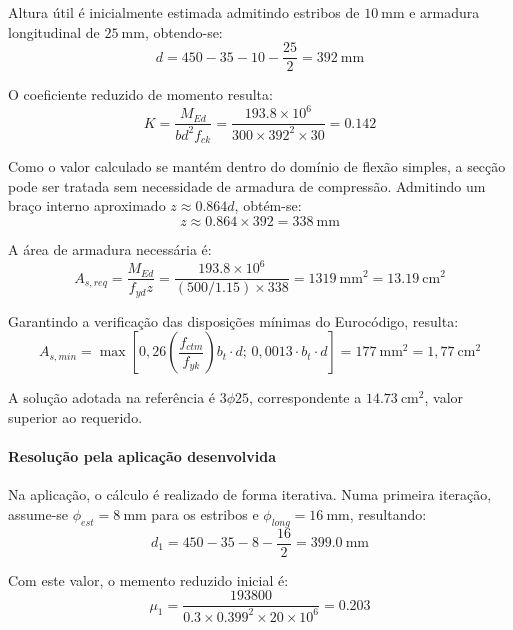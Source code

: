 Altura útil é inicialmente estimada admitindo estribos de \(10\ \text{mm}\) e armadura longitudinal de \(25\ \text{mm}\), obtendo-se:
\begin{equation}
d = 450 - 35 - 10 - \frac{25}{2} = 392\ \text{mm}
\end{equation}

O coeficiente reduzido de momento resulta:
\begin{equation}
K = \frac{M_{Ed}}{b d^2 f_{ck}}
= \frac{193.8 \times 10^6}{300 \times 392^2 \times 30}
= 0.142
\end{equation}

Como o valor calculado se mantém dentro do domínio de flexão simples, a secção pode ser tratada sem necessidade de armadura de compressão. Admitindo um braço interno aproximado \(z \approx 0.864d\), obtém-se:
\begin{equation}
z \approx 0.864 \times 392 = 338\ \text{mm}
\end{equation}

A área de armadura necessária é:
\begin{equation}
A_{s,req} =
\frac{M_{Ed}}{f_{yd} z}
=
\frac{193.8 \times 10^6}{(500/1.15)\times 338}
= 1319\ \text{mm}^2
= 13.19\ \text{cm}^2
\end{equation}

Garantindo a verificação das disposições mínimas do Eurocódigo, resulta:
\begin{equation}
    A_{s,min} = \max\left[ 0{,}26 \left( \frac{f_{ctm}}{f_{yk}} \right) b_t \cdot d;\, 0{,}0013 \cdot b_t \cdot d \right] = 177\ \text{mm}^2 = 1{,}77\ \text{cm}^2
\end{equation}

A solução adotada na referência é \(3\phi25\), correspondente a \(14.73\ \text{cm}^2\), valor superior ao requerido.

\paragraph{Resolução pela aplicação desenvolvida}

Na aplicação, o cálculo é realizado de forma iterativa. Numa primeira iteração, assume-se \(\phi_{est}=8\ \text{mm}\) para os estribos e \(\phi_{long}=16\ \text{mm}\), resultando:
\begin{equation}
d_1 = 450 - 35 - 8 - \frac{16}{2} = 399.0\ \text{mm}
\end{equation}

Com este valor, o memento reduzido inicial é:
\begin{equation}
\mu_1 =
\frac{193800}{0.3 \times 0.399^2 \times 20\times 10^6}
= 0.203
\end{equation}

